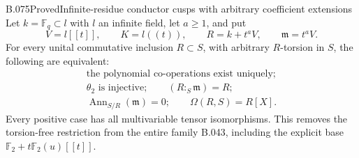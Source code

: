 \begin{saresult}{B.075}{Proved}{Infinite-residue conductor cusps with arbitrary coefficient extensions}
Let $k=\mathbb F_q\subset l$ with $l$ an infinite field, let $a\ge1$, and put
\[
 V=l[[t]],\qquad K=l((t)),\qquad R=k+t^aV,\qquad
                         \mathfrak m=t^aV.
\]
For every unital commutative inclusion $R\subset S$, with arbitrary
$R$-torsion in $S$, the following are equivalent:
\[
\begin{gathered}
 \text{the polynomial co-operations exist uniquely};\\
 \theta_2\text{ is injective};\qquad
 (R:_S\mathfrak m)=R;\\
 \operatorname{Ann}_{S/R}(\mathfrak m)=0;\qquad
 \Omega(R,S)=R[X].                                       \tag{B75.1}
\end{gathered}
\]
Every positive case has all multivariable tensor isomorphisms.
This removes the torsion-free restriction from the entire family B.043,
including the explicit base $\mathbb F_2+t\mathbb F_2(u)[[t]]$.
\end{saresult}
